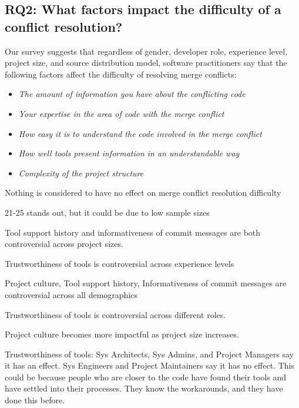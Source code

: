 \subsection{RQ2: What factors impact the difficulty of a conflict resolution?}


Our survey suggests that regardless of gender, developer role, experience level, project size, and source distribution model, software practitioners say that the following factors affect the difficulty of resolving merge conflicts: 
\begin{itemize}
\item \textit{The amount of information you have about the conflicting code}\\
\item \textit{Your expertise in the area of code with the merge conflict}\\
\item \textit{How easy it is to understand the code involved in the merge conflict}\\
\item \textit{How well tools present information in an understandable way}
\item \textit{Complexity of the project structure}
\end{itemize}

Nothing is considered to have no effect on merge conflict resolution difficulty

21-25 stands out, but it could be due to low sample sizes

Tool support history and informativeness of commit messages are both controversial across project sizes.

Trustworthiness of tools is controversial across experience levels

Project culture, Tool support history, Informativeness of commit messages are controversial across all demographics

Trustworthiness of tools is controversial across different roles.

Project culture becomes more impactful as project size increases.

Trustworthiness of tools: Sys Architects, Sys Admins, and Project Managers say it has an effect. Sys Engineers and Project Maintainers say it has no effect. This could be because people who are closer to the code have found their tools and have settled into their processes. They know the workarounds, and they have done this before.

